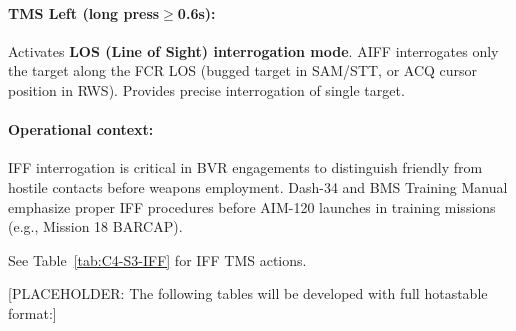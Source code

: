 \documentclass[11pt, a4paper, twoside]{report}
\newenvironment{hotastable}[1]{%
	\small
	\setlength{\tabcolsep}{2pt}
	\renewcommand{\arraystretch}{1.25}
	\begin{longtable}{L{1.00cm} L{0.90cm} L{0.90cm} L{3.30cm} L{6.40cm} L{1.40cm} L{2.10cm}}
		\caption{#1}\\
		\rowcolor{headerblue}
		\multicolumn{1}{>{\centering\arraybackslash}p{1.00cm}}{\textbf{\color{white}Mode}} &
		\multicolumn{1}{>{\centering\arraybackslash}p{0.90cm}}{\textbf{\color{white}Dir.}} &
		\multicolumn{1}{>{\centering\arraybackslash}p{0.90cm}}{\textbf{\color{white}Act.}} &
		\multicolumn{1}{>{\centering\arraybackslash}p{3.30cm}}{\textbf{\color{white}Function}} &
		\multicolumn{1}{>{\centering\arraybackslash}p{6.40cm}}{\textbf{\color{white}Effect / Nuance}} &
		\multicolumn{1}{>{\centering\arraybackslash}p{1.40cm}}{\textbf{\color{white}Dash34}} &
		\multicolumn{1}{>{\centering\arraybackslash}p{2.10cm}}{\textbf{\color{white}Train.}} \\
		\endfirsthead
		\rowcolor{headerblue}
		\multicolumn{1}{>{\centering\arraybackslash}p{1.00cm}}{\textbf{\color{white}Mode}} &
		\multicolumn{1}{>{\centering\arraybackslash}p{0.90cm}}{\textbf{\color{white}Dir.}} &
		\multicolumn{1}{>{\centering\arraybackslash}p{0.90cm}}{\textbf{\color{white}Act.}} &
		\multicolumn{1}{>{\centering\arraybackslash}p{3.30cm}}{\textbf{\color{white}Function}} &
		\multicolumn{1}{>{\centering\arraybackslash}p{6.40cm}}{\textbf{\color{white}Effect / Nuance}} &
		\multicolumn{1}{>{\centering\arraybackslash}p{1.40cm}}{\textbf{\color{white}Dash34}} &
		\multicolumn{1}{>{\centering\arraybackslash}p{2.10cm}}{\textbf{\color{white}Train.}} \\
		\endhead
		\multicolumn{7}{r}{\small\emph{Continued on next page}}\\
		\endfoot
		\endlastfoot
	}{%
	\end{longtable}
}
\begin{document}
\paragraph{TMS Left (long press$\geq$0.6s):}
Activates \textbf{LOS (Line of Sight) interrogation mode}. AIFF interrogates only the target along the FCR LOS (bugged target in SAM/STT, or ACQ cursor position in RWS). Provides precise interrogation of single target.

\paragraph{Operational context:}
IFF interrogation is critical in BVR engagements to distinguish friendly from hostile contacts before weapons employment. Dash-34 and BMS Training Manual emphasize proper IFF procedures before AIM-120 launches in training missions (e.g., Mission 18 BARCAP).

See Table~\ref{tab:C4-S3-IFF} for IFF TMS actions.


[PLACEHOLDER: The following tables will be developed with full hotastable format:]


\end{document}
